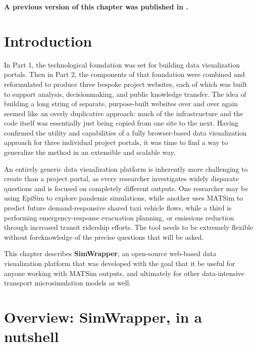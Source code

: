 \textbf{A previous version of this chapter was published in \cite{CharltonSana2023SimWrapper}.}

\hypertarget{simwrapper-introduction}{%
\section{Introduction}
\label{simwrapper-introduction}}

In Part 1, the technological foundation was set for building data visualization portals. Then in Part 2, the components of that foundation were combined and reformulated to produce three bespoke project websites, each of which was built to support analysis, decisionmaking, and public knowledge transfer. The idea of building a long string of separate, purpose-built websites over and over again seemed like an overly duplicative approach: much of the infrastructure and the code itself was essentially just being copied from one site to the next. Having confirmed the utility and capabilities of a fully browser-based data visualization approach for three individual project portals, it was time to find a way to generalize the method in an extensible and scalable way.

An entirely generic data visualization platform is inherently more challenging to create than a project portal, as every researcher investigates widely disparate questions and is focused on completely different outputs. One researcher may be using EpiSim to explore pandemic simulations, while another uses MATSim to predict future demand-responsive shared taxi vehicle flows, while a third is performing emergency-response evacuation planning, or emissions reduction through increased transit ridership efforts. The tool needs to be extremely flexible without foreknowledge of the precise questions that will be asked.

This chapter describes \textbf{SimWrapper}, an open-source web-based data visualization platform that was developed with the goal that it be useful for anyone working with MATSim outputs, and ultimately for other data-intensive transport microsimulation models as well.


\hypertarget{simwrapper-overview}{%
\section{Overview: SimWrapper, in a nutshell}
\label{simwrapper-overview}}


